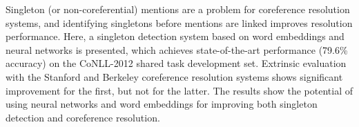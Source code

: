 Singleton (or non-coreferential) mentions are a problem for coreference resolution systems, and identifying singletons before mentions are linked improves resolution performance. Here, a singleton detection system based on word embeddings and neural networks is presented, which achieves state-of-the-art performance (79.6\% accuracy) on the CoNLL-2012 shared task development set. Extrinsic evaluation with the Stanford and Berkeley coreference resolution systems shows significant improvement for the first, but not for the latter. The results show the potential of using neural networks and word embeddings for improving both singleton detection and coreference resolution.
